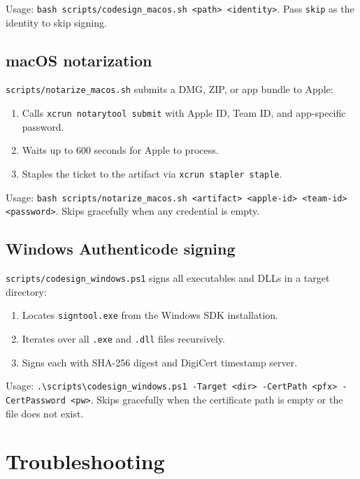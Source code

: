 \documentclass[11pt,letterpaper]{article}
\newcommand{\file}[1]{\texttt{#1}}
\newcommand{\cmd}[1]{\texttt{#1}}
\begin{document}
Usage: \cmd{bash scripts/codesign\_macos.sh <path> <identity>}. Pass \cmd{skip} as the identity to skip signing.

\subsection{macOS notarization}

\file{scripts/notarize\_macos.sh} submits a DMG, ZIP, or app bundle to Apple:

\begin{enumerate}[leftmargin=1.5em,itemsep=0.1em]
  \item Calls \cmd{xcrun notarytool submit} with Apple ID, Team ID, and app-specific password.
  \item Waits up to 600 seconds for Apple to process.
  \item Staples the ticket to the artifact via \cmd{xcrun stapler staple}.
\end{enumerate}

Usage: \cmd{bash scripts/notarize\_macos.sh <artifact> <apple-id> <team-id> <password>}. Skips gracefully when any credential is empty.

\subsection{Windows Authenticode signing}

\file{scripts/codesign\_windows.ps1} signs all executables and DLLs in a target directory:

\begin{enumerate}[leftmargin=1.5em,itemsep=0.1em]
  \item Locates \cmd{signtool.exe} from the Windows SDK installation.
  \item Iterates over all \file{.exe} and \file{.dll} files recursively.
  \item Signs each with SHA-256 digest and DigiCert timestamp server.
\end{enumerate}

Usage: \cmd{.\textbackslash scripts\textbackslash codesign\_windows.ps1 -Target <dir> -CertPath <pfx> -CertPassword <pw>}. Skips gracefully when the certificate path is empty or the file does not exist.

\section{Troubleshooting}
\end{document}
